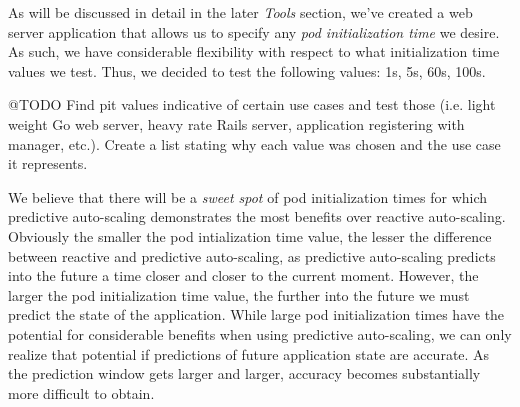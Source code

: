 As will be discussed in detail in the later \textit{Tools} section, we've created a web
server application that allows us to specify any \textit{pod
initialization time} we desire. As such, we have considerable flexibility with
respect to what initialization time values we test. Thus, we decided to test the
following values: 1s, 5s, 60s, 100s.

@TODO Find pit values indicative of certain use cases and test those (i.e. light
weight Go web server, heavy rate Rails server, application registering with
manager, etc.). Create a list stating why each value was chosen
and the use case it represents.

We believe that there will be a \textit{sweet spot} of pod initialization times
for which predictive auto-scaling demonstrates the most benefits over reactive
auto-scaling. Obviously the smaller the pod intialization time value, the lesser
the difference between reactive and predictive auto-scaling, as predictive
auto-scaling predicts into the future a time closer and closer to the current
moment. However, the larger the pod initialization time value, the further into
the future we must predict the state of the application. While large pod
initialization times have the potential for considerable benefits when using
predictive auto-scaling, we can only realize that potential if predictions of
future application state are accurate. As the prediction window gets larger and
larger, accuracy becomes substantially more difficult to obtain.

